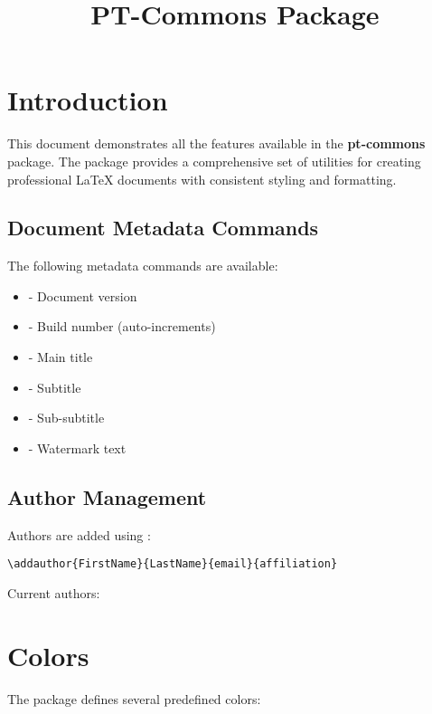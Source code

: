 \documentclass[11pt,letterpaper]{article}
\title{PT-Commons Package}
\begin{document}
\section{Introduction}

This document demonstrates all the features available in the \textbf{pt-commons} package. The package provides a comprehensive set of utilities for creating professional LaTeX documents with consistent styling and formatting.

\subsection{Document Metadata Commands}

The following metadata commands are available:

\begin{itemize}
    \item {} - Document version
    \item {} - Build number (auto-increments)
    \item {} - Main title
    \item {} - Subtitle
    \item {} - Sub-subtitle
    \item {} - Watermark text
\end{itemize}

\subsection{Author Management}

Authors are added using :

\begin{verbatim}
\addauthor{FirstName}{LastName}{email}{affiliation}
\end{verbatim}

Current authors: \titleauthorsnames{, }

\section{Colors}

The package defines several predefined colors:
\end{document}
